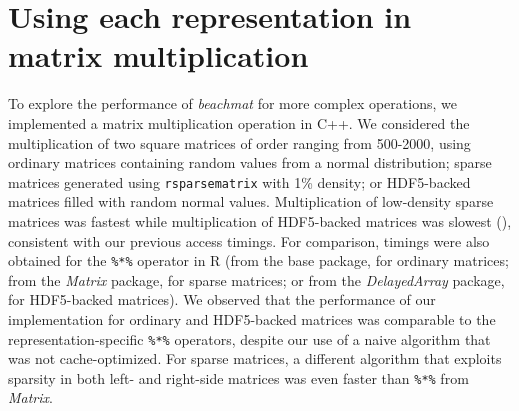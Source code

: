 \documentclass{article}
\newcommand{\beachmat}{\textit{beachmat}}
\newcommand{\code}[1]{\texttt{#1}}
\begin{document}
\section{Using each representation in matrix multiplication}
To explore the performance of \beachmat{} for more complex operations, we implemented a matrix multiplication operation in C++.
We considered the multiplication of two square matrices of order ranging from 500-2000, using ordinary matrices containing random values from a normal distribution;
sparse matrices generated using \code{rsparsematrix} with 1\% density;
or HDF5-backed matrices filled with random normal values.
Multiplication of low-density sparse matrices was fastest while multiplication of HDF5-backed matrices was slowest (\suppfigmatmult{}), consistent with our previous access timings.
For comparison, timings were also obtained for the \code{\%*\%} operator in R (from the base package, for ordinary matrices; 
from the \textit{Matrix} package, for sparse matrices;
or from the \textit{DelayedArray} package, for HDF5-backed matrices).
We observed that the performance of our implementation for ordinary and HDF5-backed matrices was comparable to the representation-specific \code{\%*\%} operators,
despite our use of a naive algorithm that was not cache-optimized.
For sparse matrices, a different algorithm that exploits sparsity in both left- and right-side matrices was even faster than \code{\%*\%} from \textit{Matrix}.



\end{document}

